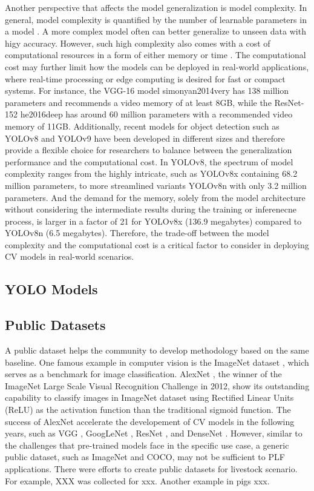 Another perspective that affects the model generalization is model complexity. In general, model complexity is quantified by the number of learnable parameters in a model \citep{}. A more complex model often can better generalize to unseen data with higy accuracy. However, such high complexity also comes with a cost of computational resources in a form of either memory or time \citep{}. The computational cost may further limit how the models can be deployed in real-world applications, where real-time processing or edge computing is desired for fast or compact systems. For instance, the VGG-16 model {simonyan2014very} has 138 million parameters and recommends a video memory of at least 8GB, while the ResNet-152 {he2016deep} has around 60 million parameters with a recommended video memory of 11GB. Additionally, recent models for object detection such as YOLOv8 \citep{} and YOLOv9 \citep{} have been developed in different sizes and therefore provide a flexible choice for researchers to balance between the generalization performance and the computational cost. In YOLOv8, the spectrum of model complexity ranges from the highly intricate, such as YOLOv8x containing 68.2 million parameters, to more streamlined variants YOLOv8n with only 3.2 million parameters. And the demand for the memory, solely from the model architecture without considering the intermediate results during the training or inferenecne process, is larger in a factor of 21 for YOLOv8x (136.9 megabytes) compared to YOLOv8n (6.5 megabytes). Therefore, the trade-off between the model complexity and the computational cost is a critical factor to consider in deploying CV models in real-world scenarios.

\subsection*{YOLO Models}

\subsection*{Public Datasets}

A public dataset helps the community to develop methodology based on the same baseline. One famous example in computer vision is the ImageNet dataset \citep{}, which serves as a benchmark for image classification. AlexNet \citep{}, the winner of the ImageNet Large Scale Visual Recognition Challenge in 2012, show its outstanding capability to classify images in ImageNet dataset using Rectified Linear Units (ReLU) as the activation function than the traditional sigmoid function. The success of AlexNet accelerate the developement of CV models in the following years, such as VGG \citep{}, GoogLeNet \citep{}, ResNet \citep{}, and DenseNet \citep{}. However, similar to the challenges that  pre-trained models face in the specific use case, a generic public dataset, such as ImageNet and COCO, may not be sufficient to PLF applications. There  were efforts to create public datasets for livestock scenario. For example, XXX \citep{} was collected for xxx. Another example in pigs xxx.

